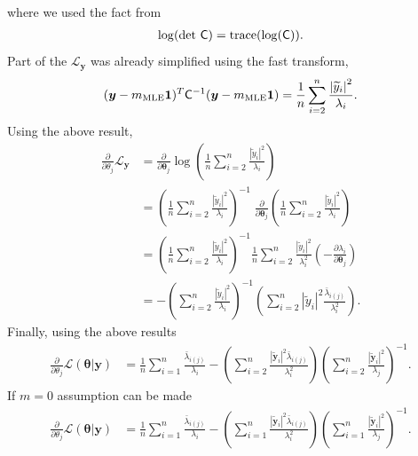 \documentclass{iitthesis}          %
\newcommand{\bm}[1]{\boldsymbol{#1}}
\newcommand{\trace}[1]{\textup{trace}{#1}}
\newcommand{\vtheta}{{\bm{\theta}}}
\newcommand{\vy}{\bm{y}}
\newcommand{\tvy}{\tilde{\bm{y}}}
\newcommand{\vone}{\bm{1}}
\newcommand{\mC}{\mathsf{C}}
\newcommand{\mCInv}{{\mathsf{C}^{-1}}}
\newcommand{\MLE}{\textup{MLE}}
\def\abs#1{\ensuremath{\left \lvert #1 \right \rvert}}
\begin{document}
where we used the fact from \cite{Hig08}
\begin{align*}
\log(\det\, \mC)  = \trace{ (\log( \mC)) }.
\end{align*}
Part of the $\mathcal{L}_{\vy}$ was already simplified using the fast transform,
\begin{align*}
{(\vy-m_\MLE\vone)^T\mCInv(\vy-m_\MLE\vone)} = \frac{1}{n} \sum_{i=2}^n \frac{\abs{\widetilde{y}_i}^2}{\lambda_i}.
\end{align*}
Using the above result,
\begin{align*}
\frac{\partial}{\partial \theta_j} \mathcal{L}_{\vy} 
&= \frac{\partial}{\partial \vtheta_j} \log\left(\frac{1}{n} \sum_{i=2}^n \frac{\abs{\widetilde{y}_i}^2}{\lambda_i} \right) 
\\ 
&= \left(\frac{1}{n} \sum_{i=2}^n \frac{\abs{\widetilde{y}_i}^2}{\lambda_i}\right)^{-1}
\;
\frac{\partial}{\partial \vtheta_j} \left(\frac{1}{n} \sum_{i=2}^n \frac{\abs{\widetilde{y}_i}^2}{\lambda_i} \right) 
\\ &= \left(
\frac{1}{n} \sum_{i=2}^n \frac{\abs{\widetilde{y}_i}^2}{\lambda_i} \right)^{-1} \frac{1}{n} \sum_{i=2}^n \frac{\abs{\widetilde{y}_i}^2}{\lambda_i^2}
\left( -\frac{\partial \lambda_i}{\partial \vtheta_j} \right)
\\ &= -\left(
\sum_{i=2}^n \frac{\abs{\widetilde{y}_i}^2}{\lambda_i} \right)^{-1} 
\left( \sum_{i=2}^n \abs{\widetilde{y}_i}^2 \frac{ \bar{ \lambda}_{i(j)} }{\lambda_i^2}
 \right).
\end{align*}
Finally, using the above results
\begin{align*}
\frac{\partial}{\partial \theta_j} \mathcal{L}(\vtheta | \vy) 
&=  \frac 1n \sum_{i=1}^{n} \frac{\bar{\lambda}_{i(j)}}{\lambda_i}
- \left({ \sum_{i=2}^n \frac{\abs{\tvy_i}^2 \bar{\lambda}_{i(j)}}{\lambda_i^2}}\right)
\left( {\sum_{i=2}^n \frac{\abs{\tvy_i}^2}{\lambda_j}} \right)^{-1}.
\end{align*}
If $m=0$ assumption can be made
\begin{align*}
\frac{\partial}{\partial \theta_j} \mathcal{L}(\vtheta | \vy) 
&=  \frac 1n \sum_{i=1}^{n} \frac{\bar{\lambda}_{i(j)}}{\lambda_i}
- \left({ \sum_{i=1}^n \frac{\abs{\tvy_i}^2 \bar{\lambda}_{i(j)}}{\lambda_i^2}}\right)
\left( {\sum_{i=1}^n \frac{\abs{\tvy_i}^2}{\lambda_j}} \right)^{-1}.
\end{align*}

\end{document}
